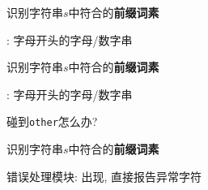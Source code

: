 \begin{frame}{}
  \begin{center}
    识别字符串$s$中符合的{\bf 前缀词素}

    \vspace{0.50cm}
    \id: 字母开头的字母/数字串

    \pause
    \vspace{0.20cm}

  \end{center}
\end{frame}

\begin{frame}{}
  \begin{center}
    识别字符串$s$中符合的{\bf 前缀词素}

    \vspace{0.60cm}
    \id: 字母开头的字母/数字串

    \vspace{0.60cm}

    \pause
    \vspace{0.40cm}
     碰到\texttt{other}怎么办?
  \end{center}
\end{frame}

\begin{frame}{}
  \begin{center}
    识别字符串$s$中符合的{\bf 前缀词素}

    \vspace{0.60cm}

    \vspace{0.50cm}
    错误处理模块: 出现, 直接报告异常字符
  \end{center}
\end{frame}

